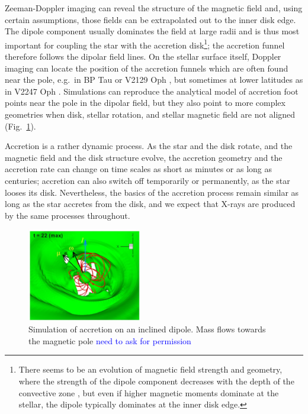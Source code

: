 Zeeman-Doppler imaging can reveal the structure of the magnetic field and, using certain assumptions, those fields can be extrapolated out to the inner disk edge. The dipole component usually dominates the field at large radii and is thus most important for coupling the star with the accretion disk\footnote{There seems to be an evolution of magnetic field strength and geometry, where the strength of the dipole component decreases with the depth of the convective zone \cite{2012ApJ...755...97G,2019A&A...622A..72V}, but even if higher magnetic moments dominate at the stellar, the dipole typically dominates at the inner disk edge.}; the accretion funnel therefore follows the dipolar field lines. On the stellar surface itself, Doppler imaging can locate the position of the accretion funnels which are often found near the pole, e.g.\ in BP Tau \cite{2008MNRAS.386.1234D} or V2129 Oph \cite{2011A&A...530A...1A}, but sometimes at lower latitudes as in V2247 Oph \cite{2010MNRAS.402.1426D}. 
Simulations can reproduce the analytical model of accretion foot points near the pole in the dipolar field, but they also point to more complex geometries when disk, stellar rotation, and stellar magnetic field are not aligned (Fig.~\ref{fig:romanova}).

Accretion is a rather dynamic process. As the star and the disk rotate, and the magnetic field and the disk structure evolve, the accretion geometry and the accretion rate can change on time scales as short as minutes or as long as centuries; accretion can also switch off temporarily or permanently, as the star looses its disk. Nevertheless, the basics of the  accretion process remain similar as long as the star accretes from the disk, and we expect that X-rays are produced by the same processes throughout.

\begin{figure}[t]
\centering
\includegraphics[width=5cm]{figs/Romanova2021fig8-panel.png}
\caption{Simulation of accretion on an inclined dipole. Mass flows towards the magnetic pole \cite{2021MNRAS.506..372R} \textcolor{blue}{need to ask for permission} \label{fig:romanova}}
\end{figure}





